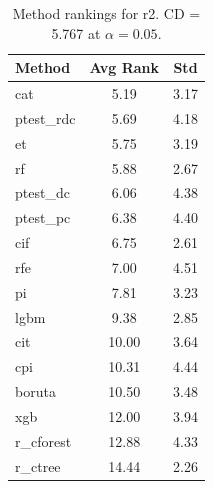 \begin{table}[h]
\centering
\caption{Method rankings for r2. CD = 5.767 at $\alpha=0.05$.}
\label{tab:ranks_r2}
\begin{tabular}{lcc}
\toprule
Method & Avg Rank & Std \\
\midrule
cat & 5.19 & 3.17 \\
ptest_rdc & 5.69 & 4.18 \\
et & 5.75 & 3.19 \\
rf & 5.88 & 2.67 \\
ptest_dc & 6.06 & 4.38 \\
ptest_pc & 6.38 & 4.40 \\
cif & 6.75 & 2.61 \\
rfe & 7.00 & 4.51 \\
pi & 7.81 & 3.23 \\
lgbm & 9.38 & 2.85 \\
cit & 10.00 & 3.64 \\
cpi & 10.31 & 4.44 \\
boruta & 10.50 & 3.48 \\
xgb & 12.00 & 3.94 \\
r_cforest & 12.88 & 4.33 \\
r_ctree & 14.44 & 2.26 \\
\bottomrule
\end{tabular}
\end{table}